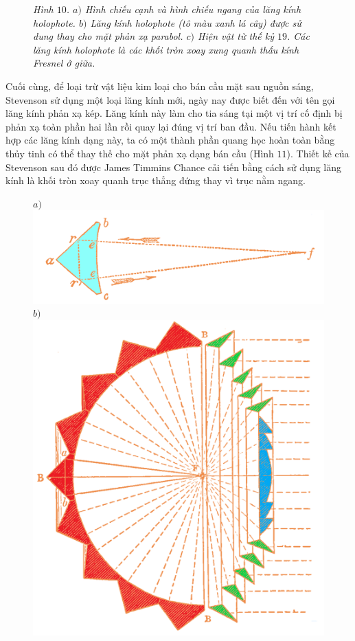 \begin{multicols}{2}
\begin{figure}[H]
		\caption{\small\textit{\color{timhieukhoahoc}Hình $10$. $a)$ Hình chiếu cạnh và hình chiếu ngang của lăng kính holophote. $b)$ Lăng kính holophote (tô màu xanh lá cây) được sử dung thay cho mặt phản xạ parabol. $c)$ Hiện vật từ thế kỷ $19$. Các lăng kính holophote là các khối tròn xoay xung quanh thấu kính Fresnel ở giữa.}}
		\vspace*{-10pt}
	\end{figure}
	Cuối cùng, để loại trừ vật liệu kim loại cho bán cầu mặt sau nguồn sáng, Stevenson sử dụng một loại lăng kính mới, ngày nay được biết đến với tên gọi lăng kính phản xạ kép. Lăng kính này làm cho tia sáng tại một vị trí cố định bị phản xạ toàn phần hai lần rồi quay lại đúng vị trí ban đầu. Nếu tiến hành kết hợp các lăng kính dạng này, ta có một thành phần quang học hoàn toàn bằng thủy tinh có thể thay thế cho mặt phản xạ dạng bán cầu (Hình $11$). Thiết kế của Stevenson sau đó được James Timmins Chance cải tiến bằng cách sử dụng lăng kính là khối tròn xoay quanh trục thẳng đứng thay vì trục nằm ngang.
	\begin{figure}[H]
		\vspace*{-5pt}
		\centering
		\captionsetup{labelformat= empty, justification=centering}
		$a)$\includegraphics[width= 1\linewidth]{12a}
		$b)$\includegraphics[width= 1\linewidth]{12b}

\end{figure}
\end{multicols}
